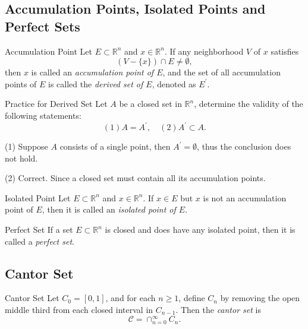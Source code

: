 \subsection{Accumulation Points, Isolated Points and Perfect Sets}

\begin{definition}{Accumulation Point}{}
  Let $E \subset \mathbb{R}^n$ and $x \in \mathbb{R}^n$.
  If any neighborhood $V$ of $x$ satisfies
  \begin{equation}
    (V - \{x\}) \cap E \neq \emptyset,
  \end{equation}
  then $x$ is called an \emph{accumulation point of $E$},
  and the set of all accumulation points of $E$ is called the \emph{derived set
    of $E$}, denoted as $E^{\prime}$.
\end{definition}

\begin{example}{Practice for Derived Set}{}
  Let $A$ be a closed set in $\mathbb{R}^n$,
  determine the validity of the following statements:
  \begin{equation}
    (1) A = A^{\prime}, \quad
    (2) A^{\prime} \subset A.
  \end{equation}
\end{example}

\begin{solution}
  (1) Suppose $A$ consists of a single point,
  then $A^{\prime} = \emptyset$, thus the conclusion does not hold.

  (2) Correct. Since a closed set must contain all its accumulation points.
\end{solution}

\begin{definition}{Isolated Point}{}
  Let $E \subset \mathbb{R}^n$ and $x \in \mathbb{R}^n$.
  If $x \in E$ but $x$ is not an accumulation point of $E$,
  then it is called an \emph{isolated point of $E$}.
\end{definition}

\begin{definition}{Perfect Set}{}
  If a set $E \subset \mathbb{R}^n$ is closed and does have any isolated point,
  then it is called a \emph{perfect set}.
\end{definition}



\subsection{Cantor Set}

\begin{definition}{Cantor Set}{}
  Let $C_0 = [0, 1]$, and for each $n \geq 1$, define $C_n$ by removing the open
  middle third from each closed interval in $C_{n-1}$.
  Then the \emph{cantor set} is
  \begin{equation}
    \mathcal{C} = \cap _{n = 0}^{\infty}C_n.
  \end{equation}
\end{definition}


